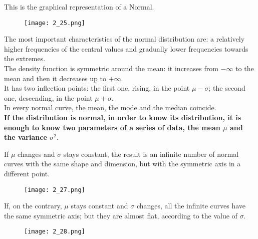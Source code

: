 \begin{frame}
\vspace*{.25cm}
This is the graphical representation of a Normal.\\
\vspace*{.25cm}
\begin{figure}
\texttt{[image: 2\_25.png]}
\end{figure}
\end{frame}

\begin{frame}
  \vspace*{.25cm}
  The most important characteristics of the normal distribution are: a relatively higher frequencies of the central values and gradually lower frequencies towards the extremes. \\
  \vspace*{.25cm}
  The density function is symmetric around the mean: it increases from $ -\infty $ to the mean and then it decreases up to $ +\infty $. \\
  \vspace*{.25cm}
  It has two inflection points: the first one, rising, in the point $ \mu - \sigma $; the second one, descending, in the point $ \mu + \sigma $. \\
  \vspace*{.25cm}
  In every normal curve, the mean, the mode and the median coincide. \\
  \vspace*{.25cm}
  \textbf{If the distribution is normal, in order to know its distribution, it is enough to know two parameters of a series of data, the mean {\boldmath$ \mu $} and the variance {\boldmath$ \sigma ^2 $}}.
\end{frame}

\begin{frame}
  \vspace*{.25cm}
  If $ \mu $ changes and $ \sigma $ stays constant, the result is an infinite number of normal curves with the same shape and dimension, but with the symmetric axis in a different point.
  \begin{figure}
    \texttt{[image: 2\_27.png]}
  \end{figure}
\end{frame}

\begin{frame}
  \vspace*{.25cm}
  If, on the contrary, $ \mu $ stays constant and $ \sigma $ changes, all the infinite curves have the same symmetric axis; but they are almost flat, according to the value of $ \sigma $.
  \begin{figure}
    \texttt{[image: 2\_28.png]}
  \end{figure}
\end{frame}

